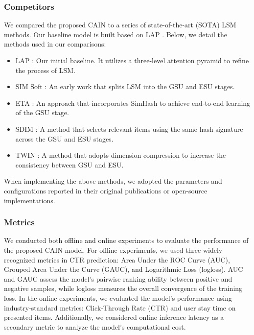 \subsubsection{\textbf{Competitors}}

We compared the proposed CAIN to a series of state-of-the-art (SOTA) LSM methods. Our baseline model is built based on LAP \cite{hou2024cross}. Below, we detail the methods used in our comparisons:

\begin{itemize}

\item LAP \cite{hou2024cross}: Our initial baseline. It utilizes a three-level attention pyramid to refine the process of LSM.

\item SIM Soft \cite{pi2020search}: An early work that splits LSM into the GSU and ESU stages.

\item ETA \cite{chen2022efficient}: An approach that incorporates SimHash to achieve end-to-end learning of the GSU stage.

\item SDIM \cite{cao2022sampling}: A method that selects relevant items using the same hash signature across the GSU and ESU stages.

\item TWIN \cite{chang2023twin}: A method that adopts dimension compression to increase the consistency between GSU and ESU.

\end{itemize}

When implementing the above methods, we adopted the parameters and configurations reported in their original publications or open-source implementations.

\subsubsection{\textbf{Metrics}}

We conducted both offline and online experiments to evaluate the performance of the proposed CAIN model. For offline experiments, we used three widely recognized metrics in CTR prediction: Area Under the ROC Curve (AUC), Grouped Area Under the Curve (GAUC), and Logarithmic Loss (logloss). AUC and GAUC assess the model's pairwise ranking ability between positive and negative samples, while logloss measures the overall convergence of the training loss. In the online experiments, we evaluated the model's performance using industry-standard metrics: Click-Through Rate (CTR) and user stay time on presented items. Additionally, we considered online inference latency as a secondary metric to analyze the model's computational cost. 

